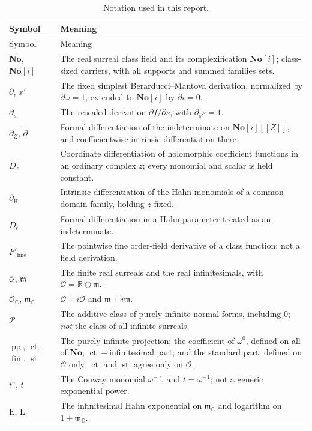 \documentclass[11pt,letterpaper]{article}
\numberwithin{equation}{section}
\theoremstyle{definition}
\theoremstyle{remark}
\newcommand{\No}{\mathbf{No}}
\newcommand{\SC}{\mathbf{No}[i]}
\newcommand{\R}{\mathbb R}
\newcommand{\C}{\mathbb C}
\newcommand{\der}{\partial}
\newcommand{\Ofin}{\mathcal O}
\newcommand{\mm}{\mathfrak m}
\newcommand{\Pcl}{\mathcal P}
\newcommand{\pp}{\operatorname{pp}}
\newcommand{\ct}{\operatorname{ct}}
\newcommand{\st}{\operatorname{st}}
\newcommand{\fin}{\operatorname{fin}}
\newcommand{\Emm}{\mathrm{E}}
\newcommand{\Lmm}{\mathrm{L}}
\newcommand{\dercoef}{\der_{\mathrm H}}
\newcommand{\dertil}{\widetilde{\der}}
\newcommand{\derZ}{\der_{Z}}
\newcommand{\Dz}{D_{z}}
\begin{document}
\begin{longtable}{@{}L{0.17\textwidth}L{0.76\textwidth}@{}}
\caption{Notation used in this report.}
\label{diff:tab:notation}\\
\toprule
Symbol & Meaning \\
\midrule\endfirsthead
\toprule Symbol & Meaning \\\midrule\endhead
$\No$, $\SC$ & The real surreal class field and its complexification
$\No[i]$; class-sized carriers, with all supports and summed families sets. \\
$\der$, $x'$ & The fixed simplest Berarducci--Mantova derivation, normalized
by $\der\omega=1$, extended to $\SC$ by $\der i=0$. \\
$\der_{s}$ & The rescaled derivation $\der f/\der s$, with
$\der_{s}s=1$. \\
$\derZ$, $\dertil$ & Formal differentiation of the indeterminate on
$\SC[[Z]]$, and coefficientwise intrinsic differentiation there. \\
$\Dz$ & Coordinate differentiation of holomorphic coefficient functions in an
ordinary complex $z$; every monomial and scalar is held constant. \\
$\dercoef$ & Intrinsic differentiation of the Hahn monomials of a
common-domain family, holding $z$ fixed. \\
$D_{t}$ & Formal differentiation in a Hahn parameter treated as an
indeterminate. \\
$F'_{\mathrm{fine}}$ & The pointwise fine order-field derivative of a class
function; not a field derivation. \\
$\Ofin$, $\mm$ & The finite real surreals and the real infinitesimals, with
$\Ofin=\R\oplus\mm$. \\
$\Ofin_{\C}$, $\mm_{\C}$ & $\Ofin+i\Ofin$ and $\mm+i\mm$. \\
$\Pcl$ & The additive class of purely infinite normal forms, including $0$;
\emph{not} the class of all infinite surreals. \\
$\pp$, $\ct$, $\fin$, $\st$ & The purely infinite projection; the coefficient
of $\omega^{0}$, defined on all of $\No$; $\ct+{}$infinitesimal part; and the
standard part, defined on $\Ofin$ only. $\ct$ and $\st$ agree only on
$\Ofin$. \\
$t^{\gamma}$, $t$ & The Conway monomial $\omega^{-\gamma}$, and
$t=\omega^{-1}$; not a generic exponential power. \\
$\Emm$, $\Lmm$ & The infinitesimal Hahn exponential on $\mm_{\C}$ and
logarithm on $1+\mm_{\C}$. \\

\end{longtable}
\end{document}
